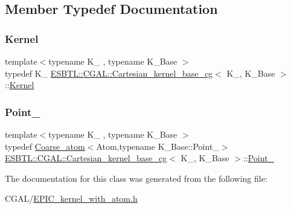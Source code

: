 \subsection{Member Typedef Documentation}
\mbox{\label{classESBTL_1_1CGAL_1_1Cartesian__kernel__base__cg_a0e4e4792eb3643c5f639481e54d3da79}} 
\subsubsection{\texorpdfstring{Kernel}{Kernel}}
{\footnotesize\ttfamily template$<$typename K\+\_\+ , typename K\+\_\+\+Base $>$ \\
typedef K\+\_\+ \hyperlink{classESBTL_1_1CGAL_1_1Cartesian__kernel__base__cg}{E\+S\+B\+T\+L\+::\+C\+G\+A\+L\+::\+Cartesian\+\_\+kernel\+\_\+base\+\_\+cg}$<$ K\+\_\+, K\+\_\+\+Base $>$\+::\hyperlink{classESBTL_1_1CGAL_1_1Cartesian__kernel__base__cg_a0e4e4792eb3643c5f639481e54d3da79}{Kernel}}

\mbox{\label{classESBTL_1_1CGAL_1_1Cartesian__kernel__base__cg_a332637869c2baa408be0c6f537f7929d}} 
\subsubsection{\texorpdfstring{Point\+\_}{Point\_3}}
{\footnotesize\ttfamily template$<$typename K\+\_\+ , typename K\+\_\+\+Base $>$ \\
typedef \hyperlink{classESBTL_1_1Coarse__atom}{Coarse\+\_\+atom}$<$Atom,typename K\+\_\+\+Base\+::\+Point\+\_$>$ \hyperlink{classESBTL_1_1CGAL_1_1Cartesian__kernel__base__cg}{E\+S\+B\+T\+L\+::\+C\+G\+A\+L\+::\+Cartesian\+\_\+kernel\+\_\+base\+\_\+cg}$<$ K\+\_\+, K\+\_\+\+Base $>$\+::\hyperlink{classESBTL_1_1CGAL_1_1Cartesian__kernel__base__cg_a332637869c2baa408be0c6f537f7929d}{Point\+\_}}



The documentation for this class was generated from the following file\+:\begin{DoxyCompactItemize}
\item 
C\+G\+A\+L/\hyperlink{EPIC__kernel__with__atom_8h}{E\+P\+I\+C\+\_\+kernel\+\_\+with\+\_\+atom.\+h}\end{DoxyCompactItemize}
